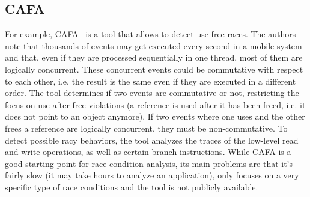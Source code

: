 \documentclass[11pt,a4paper,notitlepage]{article}
\begin{document}
\subsection{CAFA}
For example, CAFA~\cite{Hsiao:2014:RDE:2666356.2594330} is a tool that allows to detect use-free races. The authors note that thousands of events may get executed every second in a mobile system and that, even if they are processed sequentially in one thread, most of them are logically concurrent. These concurrent events could be commutative with respect to each other, i.e. the result is the same even if they are executed in a different order. The tool determines if two events are commutative or not, restricting the focus on use-after-free violations (a reference is used after it has been freed, i.e. it does not point to an object anymore). If two events where one uses and the other frees a reference are logically concurrent, they must be non-commutative. To detect possible racy behaviors, the tool analyzes the traces of the low-level read and write operations, as well as certain branch instructions. While CAFA is a good starting point for race condition analysis, its main problems are that it's fairly slow (it may take hours to analyze an application), only focuses on a very specific type of race conditions and the tool is not publicly available.
\end{document}
